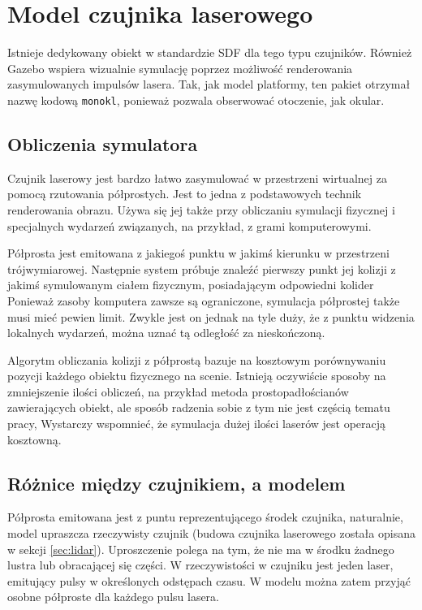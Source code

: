 \chapter{Model czujnika laserowego}
\label{sec:monokl}
Istnieje dedykowany obiekt w standardzie SDF dla tego typu czujników.
Również Gazebo wspiera wizualnie symulację poprzez możliwość renderowania zasymulowanych impulsów lasera.
Tak, jak model platformy, ten pakiet otrzymał nazwę kodową \texttt{monokl}, ponieważ pozwala obserwować otoczenie, jak okular.

\section{Obliczenia symulatora}
	Czujnik laserowy jest bardzo łatwo zasymulować w przestrzeni wirtualnej za pomocą rzutowania półprostych.
	Jest to jedna z podstawowych technik renderowania obrazu.
	Używa się jej także przy obliczaniu symulacji fizycznej i specjalnych wydarzeń związanych, na przykład, z grami komputerowymi.

	Półprosta jest emitowana z jakiegoś punktu w jakimś kierunku w przestrzeni trójwymiarowej.
	Następnie system próbuje znaleźć pierwszy punkt jej kolizji z jakimś symulowanym ciałem fizycznym, posiadającym odpowiedni kolider 
	Ponieważ zasoby komputera zawsze są ograniczone, symulacja półprostej także musi mieć pewien limit. 
	Zwykle jest on jednak na tyle duży, że z punktu widzenia lokalnych wydarzeń, można uznać tą odległość za nieskończoną.

	Algorytm obliczania kolizji z półprostą bazuje na kosztowym porównywaniu pozycji każdego obiektu fizycznego na scenie.
	Istnieją oczywiście sposoby na zmniejszenie ilości obliczeń, na przykład metoda prostopadłościanów zawierających obiekt, ale sposób radzenia sobie z tym nie jest
	częścią tematu pracy,
	Wystarczy wspomnieć, że symulacja dużej ilości laserów jest operacją kosztowną.

\section{Różnice między czujnikiem, a modelem}
	Półprosta emitowana jest z puntu reprezentującego środek czujnika, naturalnie, model upraszcza rzeczywisty czujnik (budowa czujnika laserowego została opisana w sekcji \ref{sec:lidar}).
	Uproszczenie polega na tym, że nie ma w środku żadnego lustra lub obracającej się części. 
	W rzeczywistości w czujniku jest jeden laser, emitujący pulsy w określonych odstępach czasu.
	W modelu można zatem przyjąć osobne półproste dla każdego pulsu lasera.

